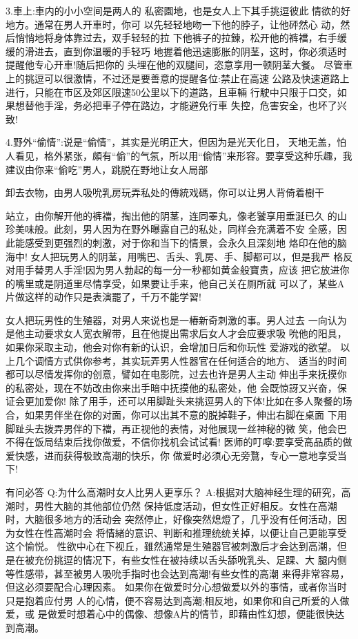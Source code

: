 \documentclass[12pt,UTF8]{ctexbook}
\begin{document}
3.車上:車内的小小空间是两人的
私密園地，也是女人上下其手挑逗彼此
情欲的好地方。通常在男人开車时，你可
以先轻轻地吻一下他的脖子，让他砰然心
动，然后悄悄地将身体靠过去，双手轻轻的拉
下他裤子的拉鍊，松开他的裤襠，右手缓缓的滑进去，直到你温暖的手轻巧
地握着他迅速膨胀的阴茎，这时，你必须适时提醒他专心开車!随后把你的
头埋在他的双腿间，恣意享用一顿阴茎大餐。
尽管車上的挑逗可以很激情，不过还是要善意的提醒各位:禁止在高速
公路及快速道路上进行，只能在市区及郊区限速50公里以下的道路，且車輛
行駛中只限于口交，如果想替他手淫，务必把車子停在路边，才能避免行車
失控，危害安全，也坏了兴致!

4.野外“偷情”:说是“偷情”，其实是光明正大，但因为是光天化日，
天地无盖，怕人看见，格外紧张，頗有“偷”的气氛，所以用“偷情”来形容。要享受这种乐趣，我建议由你来“偷吃”男人，跳脱在野地让女人局部

卸去衣物，由男人吸吮乳房玩弄私处的傳統戏碼，你可以让男人背倚着樹干

站立，由你解开他的裤襠，掏出他的阴茎，连同睪丸，像老饕享用垂涎已久
的山珍美味般。此刻，男人因为在野外曝露自己的私处，同样会充满着不安
全感，因此能感受到更强烈的刺激，对于你和当下的情景，会永久且深刻地
烙印在他的脑海中!
女人把玩男人的阴茎，用嘴巴、舌头、乳房、手、脚都可以，但是我严
格反对用手替男人手淫!因为男人勃起的每一分一秒都如黄金般寶贵，应该
把它放进你的嘴里或是阴道里尽情享受，如果要让手来，他自己关在厕所就
可以了，某些A片做这样的动作只是表演罷了，千万不能学習!

女人把玩男性的生殖器，对男人来说也是一樁新奇刺激的事。男人过去
一向认为是他主动要求女人宽衣解带，且在他提出需求后女人才会应要求吸
吮他的阳具，如果你采取主动，他会对你有新的认识，会增加日后和你玩性
爱游戏的欲望。
以上几个调情方式供你参考，其实玩弄男人性器官在任何适合的地方、
适当的时间都可以尽情发挥你的创意，譬如在电影院，过去也许是男人主动
伸出手来抚摸你的私密处，现在不妨改由你来出手暗中抚摸他的私密处，他
会既惊訝又兴奋，保证会更加爱你!
除了用手，还可以用脚趾头来挑逗男人的下体!比如在多人聚餐的场
合，如果男伴坐在你的对面，你可以出其不意的脱掉鞋子，伸出右脚在桌面
下用脚趾头去拨弄男伴的下襠，再正视他的表情，对他展现一丝神秘的微
笑，他会巴不得在饭局结束后找你做爱，不信你找机会试试看!
医师的叮嚀:要享受高品质的做爱快感，进而获得极致高潮的快乐，你
做爱时必须心无旁鶩，专心一意地享受当下!

有问必答
Q:为什么高潮时女人比男人更享乐？
A:根据对大脑神经生理的研究，高潮时，男性大脑的其他部位仍然
保持低度活动，但女性正好相反。女性在高潮时，大脑很多地方的活动会
突然停止，好像突然熄燈了，几乎没有任何活动，因为女性在性高潮时会
将情緒的意识、判断和推理统统关掉，以便让自己更能享受这个愉悦。
性欲中心在下视丘，雖然通常是生殖器官被刺激后才会达到高潮，但
是在被充份挑逗的情况下，有些女性在被持续以舌头舔吮乳头、足踝、大
腿内侧等性感带，甚至被男人吸吮手指时也会达到高潮!有些女性的高潮
来得非常容易，但这必须要配合心理因素。
如果你在做爱时分心想做爱以外的事情，或者你当时只是抱着应付男
人的心情，便不容易达到高潮;相反地，如果你和自己所爱的人做爱，或
是做爱时想着心中的偶像、想像A片的情节，即藉由性幻想，便能很快达
到高潮。
\end{document}
